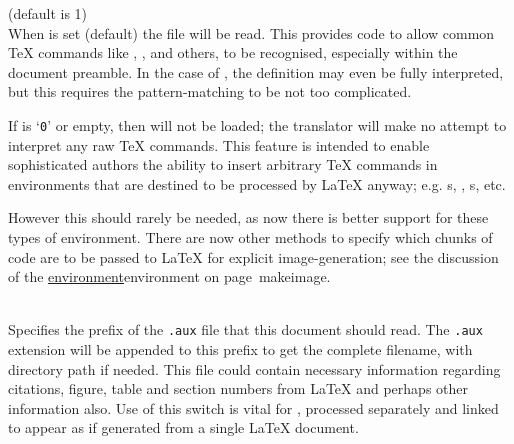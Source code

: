 \begin{htmllist}
%
%

\begin{changebar}%
\item [ -no\_tex\_defs\label{notexdefs}]
 (default is 1)\\
When  is set (default) the file  will be read.
This provides code to allow common \TeX{} commands like , ,
 and others, to be recognised, especially within the document preamble.
In the case of , the definition may even be fully interpreted,
but this requires the pattern-matching to be not too complicated.

If  is `\texttt{0}' or empty, then  will not be loaded;
the translator will make no attempt to interpret any raw \TeX{} commands.
This feature is intended to enable sophisticated authors the ability to insert
arbitrary \TeX{} commands in environments that are destined
to be processed by \LaTeX{} anyway;
e.g. s, , s, etc.
\begin{changebar}%
However this should rarely be needed, as now there is better support for these
types of environment. There are now other methods to specify which chunks of code
are to be passed to \LaTeX{} for explicit image-generation;
see the discussion of the 
\hyperref[page]{environment}{environment on page~}{}{makeimage}.
\end{changebar}


%

\item [ -external\_file \Meta{filename}\label{externalfile}]
\\
Specifies the prefix of the \texttt{.aux} file that this document should read.
The \texttt{.aux} extension will be appended to this prefix
to get the complete filename, with directory path if needed.\html{\\}
This file could contain necessary information
regarding citations, figure, table and section numbers from \LaTeX{}
and perhaps other information also.
Use of this switch is vital for ,
processed separately and linked to appear as if generated
from a single \LaTeX{} document.%


\end{changebar}
\end{htmllist}
